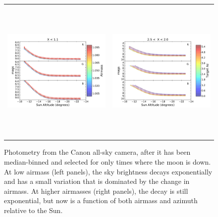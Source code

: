 \documentclass[]{spie}
\begin{document}
\begin{figure}[ht]
  \begin{center}
  \begin{tabular}{c c}
  \includegraphics[height=7cm]{plots/altDecay.pdf} & \includegraphics[height=7cm]{plots/altDecayHA.pdf}
  \end{tabular}
  \end{center}
  \caption{Photometry from the Canon all-sky camera, after it has been median-binned and selected for only times where the moon is down.  At low airmass (left panels), the sky brightness decays exponentially and has a small variation that is dominated by the change in airmass.  At higher airmasses (right panels), the decay is still exponential, but now is a function of both airmass and azimuth relative to the Sun. \label{fig:twiExp}}
\end{figure}
\end{document}
